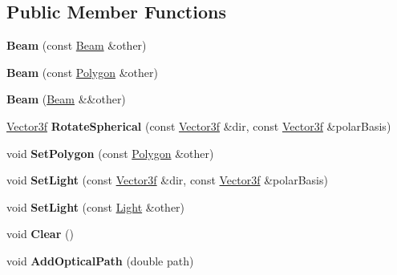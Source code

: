 \subsection*{Public Member Functions}
\begin{DoxyCompactItemize}
\item 
\mbox{\label{class_beam_adbc5396fffb1ace9dc8cd19c4fdc88cd}} 
{\bfseries Beam} (const \mbox{\hyperlink{class_beam}{Beam}} \&other)
\item 
\mbox{\label{class_beam_a05e068b4ebc57f440e097c4a63317265}} 
{\bfseries Beam} (const \mbox{\hyperlink{class_polygon}{Polygon}} \&other)
\item 
\mbox{\label{class_beam_a6341eed626313828398def11cbf3b509}} 
{\bfseries Beam} (\mbox{\hyperlink{class_beam}{Beam}} \&\&other)
\item 
\mbox{\label{class_beam_ab69efe43df201ea6baf20edb61e46da7}} 
\mbox{\hyperlink{struct_point3f}{Vector3f}} {\bfseries Rotate\+Spherical} (const \mbox{\hyperlink{struct_point3f}{Vector3f}} \&dir, const \mbox{\hyperlink{struct_point3f}{Vector3f}} \&polar\+Basis)
\item 
\mbox{\label{class_beam_a1d64711b13ffc63640f88a8134d74635}} 
void {\bfseries Set\+Polygon} (const \mbox{\hyperlink{class_polygon}{Polygon}} \&other)
\item 
\mbox{\label{class_beam_a704233632d400ba7d6fa2135e87110e9}} 
void {\bfseries Set\+Light} (const \mbox{\hyperlink{struct_point3f}{Vector3f}} \&dir, const \mbox{\hyperlink{struct_point3f}{Vector3f}} \&polar\+Basis)
\item 
\mbox{\label{class_beam_a04d2568a66519b691169ad34de1a9dc5}} 
void {\bfseries Set\+Light} (const \mbox{\hyperlink{class_light}{Light}} \&other)
\item 
\mbox{\label{class_beam_a9b3e47e4c2f90f1c8f779ef76a19ea04}} 
void {\bfseries Clear} ()
\item 
\mbox{\label{class_beam_a99651f25bb8382a0fefb45a36f6654de}} 
void {\bfseries Add\+Optical\+Path} (double path)
\item 

\end{DoxyCompactItemize}

